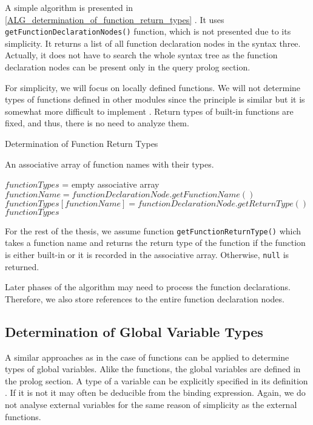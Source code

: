 A simple algorithm is presented in \ref{ALG_determination_of_function_return_types} . It uses \texttt{getFunctionDeclarationNodes()} function, which is not presented due to its simplicity. It returns a list of all function declaration nodes in the syntax three. Actually, it does not have to search the whole syntax tree as the function declaration nodes can be present only in the query prolog section. 

For simplicity, we will focus on locally defined functions. We will not determine types of functions defined in other modules since the principle is similar but it is somewhat more difficult to implement . Return types of built-in functions are fixed, and thus, there is no need to analyze them.

\begin{algorithm}
\caption{Determination of Function Return Types}
\label{ALG_determination_of_function_return_types}
\begin{algorithmic}[1]
\ENSURE An associative array of function names with their types.

\STATE $functionTypes$ = empty associative array
    \STATE $functionName = functionDeclarationNode.getFunctionName()$
    \STATE $functionTypes[functionName] = functionDeclarationNode.getReturnType()$
\ENDFOR
\RETURN $functionTypes$
\end{algorithmic}
\end{algorithm}

For the rest of the thesis, we assume function \texttt{getFunctionReturnType()} which takes a function name and returns the return type of the function if the function is either built-in or it is recorded in the associative array. Otherwise, \texttt{null} is returned.

Later phases of the algorithm may need to process the function declarations. Therefore, we also store references to the entire function declaration nodes.

\subsection{Determination of Global Variable Types}
A similar approaches as in the case of functions can be applied to determine types of global variables. Alike the functions, the global variables are defined in the prolog section. A type of a variable can be explicitly specified in its definition . If it is not it may often be deducible from the binding expression. Again, we do not analyse external variables for the same reason of simplicity as the external functions.

